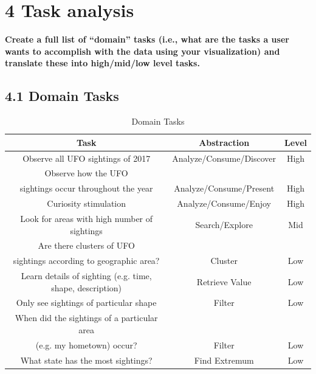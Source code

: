 \documentclass{neu_handout}
\begin{document}
\section*{4 Task analysis}

\textbf{Create a full list of “domain” tasks (i.e., what are the tasks a
user wants to accomplish with the data using your visualization) and translate these into high/mid/low level tasks.}

\subsection*{4.1 Domain Tasks}

\begin{table}[h]
\caption{Domain Tasks} %
\centering %
\begin{tabular}{c c c} %
\hline\hline %
 Task & Abstraction & Level \\ [0.5ex]
\hline %
Observe all UFO sightings of 2017 & 
Analyze/Consume/Discover & High \\[1ex] %

Observe how the UFO \\sightings occur throughout the year &
Analyze/Consume/Present &
High \\[1ex] %

Curiosity stimulation &
Analyze/Consume/Enjoy &
High \\[1ex] %

Look for areas with high number of sightings &
Search/Explore &
Mid \\[1ex] %


Are there clusters of UFO\\ sightings according to geographic area? &
Cluster &
Low  \\[1ex] %

Learn details of sighting (e.g. time, shape, description) &
Retrieve Value &
Low \\[1ex] %

Only see sightings of particular shape &
Filter &
Low \\[1ex] %

When did the sightings of a particular area \\(e.g. my hometown) occur? &
Filter &
Low \\[1ex] %

What state has the most sightings? &
Find Extremum &
Low \\[1ex] %


\end{tabular}
\end{table}
\end{document}
